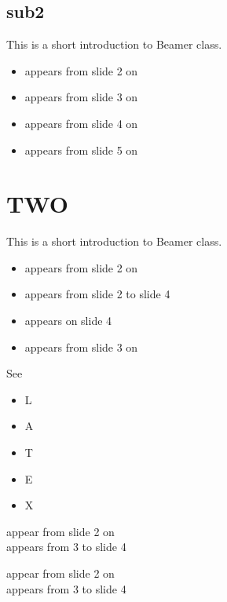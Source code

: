 \documentclass{beamer}
\begin{document}
\subsection{sub2}
\begin{frame}{2}
  This is a short introduction to Beamer class.
  \begin{itemize}
\item<2-> appears from slide 2 on
\item<3-> appears from slide 3 on
\item<4-> appears from slide 4 on
\item<5-> appears from slide 5 on
\end{itemize}
\end{frame}


\section{TWO}
\begin{frame}{3}
  This is a short introduction to Beamer class.
  \begin{itemize}
\item<2-> appears from slide 2 on
\item<2-3> appears from slide 2 to slide 4
\item<4> appears on slide 4
\item<3-> appears from slide 3 on
\end{itemize}
\end{frame}

\begin{frame}{4}
  See
\begin{itemize}[<+->]
\item L
\item A
\item T
\item E
\item X
\end{itemize}
\end{frame}

\begin{frame}
{appear from slide 2 on\\}
{appears from 3 to slide 4\\}
\end{frame}

\begin{frame}

{appear from slide 2 on\\}
{appears from 3 to slide 4\\}

\end{frame}
\end{document}
